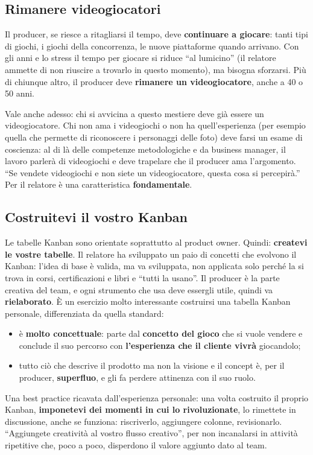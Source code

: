 \subsection{Rimanere videogiocatori}

Il producer, se riesce a ritagliarsi il tempo, deve \textbf{continuare a
giocare}: tanti tipi di giochi, i giochi della concorrenza, le nuove piattaforme
quando arrivano. Con gli anni e lo stress il tempo per giocare si riduce ``al
lumicino'' (il relatore ammette di non riuscire a trovarlo in questo momento),
ma bisogna sforzarsi. Più di chiunque altro, il producer deve
\textbf{rimanere un videogiocatore}, anche a 40 o 50 anni.

Vale anche adesso: chi si avvicina a questo mestiere deve già essere un
videogiocatore. Chi non ama i videogiochi o non ha quell'esperienza (per esempio
quella che permette di riconoscere i personaggi delle foto) deve farsi un esame
di coscienza: al di là delle competenze metodologiche e da business manager, il
lavoro parlerà di videogiochi e deve trapelare che il producer ama
l'argomento. ``Se vendete videogiochi e non siete un videogiocatore, questa cosa
si percepirà.'' Per il relatore è una caratteristica \textbf{fondamentale}.

\subsection{Costruitevi il vostro Kanban}

Le tabelle Kanban sono orientate soprattutto al product owner. Quindi:
\textbf{createvi le vostre tabelle}. Il relatore ha sviluppato un paio di
concetti che evolvono il Kanban: l'idea di base è valida, ma va sviluppata, non
applicata solo perché la si trova in corsi, certificazioni e libri e ``tutti la
usano''. Il producer è la parte creativa del team, e ogni strumento che usa
deve essergli utile, quindi va \textbf{rielaborato}. È un esercizio molto
interessante costruirsi una tabella Kanban personale, differenziata da quella
standard:
\begin{itemize}
  \item è \textbf{molto concettuale}: parte dal \textbf{concetto del gioco} che
        si vuole vendere e conclude il suo percorso con \textbf{l'esperienza che
        il cliente vivrà} giocandolo;
  \item tutto ciò che descrive il prodotto ma non la visione e il concept è, per
        il producer, \textbf{superfluo}, e gli fa perdere attinenza con il suo
        ruolo.
\end{itemize}
Una best practice ricavata dall'esperienza personale: una volta costruito il
proprio Kanban, \textbf{imponetevi dei momenti in cui lo rivoluzionate}, lo
rimettete in discussione, anche se funziona: riscriverlo, aggiungere colonne,
revisionarlo. ``Aggiungete creatività al vostro flusso creativo'', per non
incanalarsi in attività ripetitive che, poco a poco, disperdono il valore
aggiunto dato al team.

